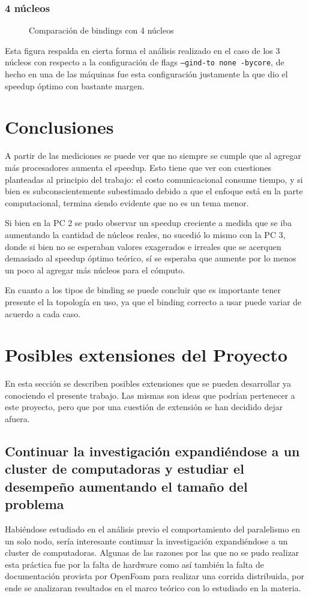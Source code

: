 \documentclass{article}
\begin{document}
\subsubsection{4 núcleos}
\begin{figure}[H]
    
    \caption{Comparación de bindings con 4 núcleos}
\end{figure}
Esta figura respalda en cierta forma el análisis realizado en el caso de los 3 núcleos con respecto a la configuración de flags \texttt{--gind-to none -bycore}, de hecho en una de las máquinas fue esta configuración justamente la que dio el speedup óptimo con bastante margen.

\newpage
\section{Conclusiones}
A partir de las mediciones se puede ver que no siempre se cumple que al agregar más procesadores aumenta el speedup. Esto tiene que ver con cuestiones planteadas al principio del trabajo: el costo comunicacional consume tiempo, y si bien es subconscientemente subestimado debido a que el enfoque está en la parte computacional, termina siendo evidente que no es un tema menor. 

Si bien en la PC 2 se pudo observar un speedup creciente a medida que se iba aumentando la cantidad de núcleos reales, no sucedió lo mismo con la PC 3, donde si bien no se esperaban valores exagerados e irreales que se acerquen demasiado al speedup óptimo teórico, sí se esperaba que aumente por lo menos un poco al agregar más núcleos para el cómputo.

En cuanto a los tipos de binding se puede concluir que es importante tener presente el la topología en uso, ya que el binding correcto a usar puede variar de acuerdo a cada caso.
\newpage
\section{Posibles extensiones del Proyecto}
En esta sección se describen posibles extensiones que se pueden desarrollar ya conociendo el presente trabajo. Las mismas son ideas que podrían pertenecer a este proyecto, pero que por una cuestión de extensión se han decidido dejar afuera.
\subsection{Continuar la investigación expandiéndose a un cluster de computadoras y estudiar el desempeño aumentando el tamaño del problema}
Habiéndose estudiado en el análisis previo el comportamiento del paralelismo en un solo nodo, sería interesante continuar la investigación expandiéndose a un cluster de computadoras. Algunas de las razones por las que no se pudo realizar esta práctica fue por la falta de hardware como así también la falta de documentación provista por OpenFoam para realizar una corrida distribuida, por ende se analizaran resultados en el marco teórico con lo estudiado en la materia.
\end{document}

